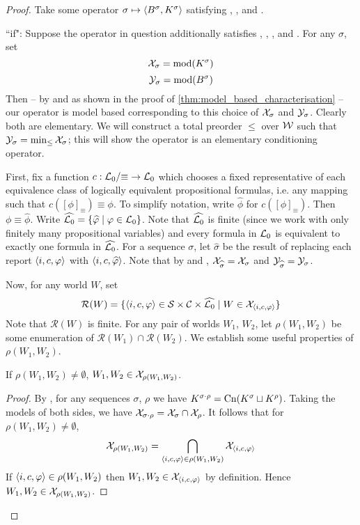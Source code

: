 \begin{proof}

Take some operator $\sigma \mapsto \langle {B^\sigma, K^\sigma} \rangle$ satisfying
\closure{}, \containment{}, \kconj{} and
\equivpost{}.

``if": Suppose the operator in question additionally satisfies
\rearr{}, \duprem{}, \condcons{},
\incvac{} and \acyc{}. For any $\sigma$, set
%
\[ \mathcal{X}_\sigma = \operatorname{mod}(K^\sigma) \] \[ \mathcal{Y}_\sigma = \operatorname{mod}(B^\sigma) \]
%
Then -- by \closure{} and \containment{} as shown in the proof of
\cref{thm:model_based_characterisation} -- our operator is model based
corresponding to this choice of $\mathcal{X}_\sigma$ and $\mathcal{Y}_\sigma$. Clearly both are
elementary. We will construct a total preorder $\le$ over $\mathcal{W}$ such that
$\mathcal{Y}_\sigma = \min_{\le}{\mathcal{X}_\sigma}$; this will show the operator is an
elementary conditioning operator.

First, fix a function $c: \mathcal{L}{}_0 / {\equiv} \to \mathcal{L}{}_0$ which chooses a fixed
representative of each equivalence class of logically equivalent propositional
formulas, i.e. any mapping such that $c([\phi]_{\equiv}) \equiv \phi$. To
simplify notation, write $\widehat{\phi}$ for $c([\phi]_{\equiv})$. Then $\phi
\equiv \widehat{\phi}$. Write $\widehat{\mathcal{L}{}_0} = \{\widehat{\varphi} \mid \varphi
\in \mathcal{L}{}_0\}$.  Note that $\widehat{\mathcal{L}{}_0}$ is finite (since we work with only
finitely many propositional variables) and every formula in $\mathcal{L}{}_0$ is
equivalent to exactly one formula in $\widehat{\mathcal{L}{}_0}$. For a sequence
$\sigma$, let $\widehat{\sigma}$ be the result of replacing each report
$\langle {i, c, \varphi} \rangle$ with $\langle {i, c, \widehat{\varphi}} \rangle$. Note that by
\rearr{} and \equivpost{}, $\mathcal{X}_{\widehat{\sigma}} =
\mathcal{X}_\sigma$ and $\mathcal{Y}_{\widehat{\sigma}} = \mathcal{Y}_\sigma$.

Now, for any world $W$, set
\newcommand{\reports}{\mathcal{R}}
\[
    \reports(W)
    = \{
        \tuple{i, c, \phi}
        \in \S \times \C \times \widehat{\lprop}
        \mid
        W \in \X_{\tuple{i, c, \phi}}
    \}
\]
Note that $\reports(W)$ is finite. For any pair of worlds $W_1$, $W_2$, let
$\rho(W_1, W_2)$ be some enumeration of $\reports(W_1) \cap \reports(W_2)$. We
establish some useful properties of $\rho(W_1, W_2)$.

    \begin{claim}
        \label{claim:w_j_in_rho}
        If $\rho(W_1, W_2) \ne \emptyset$, $W_1, W_2 \in \mathcal{X}_{\rho(W_1, W_2)}$.
    \end{claim}
    \begin{proof}
        By \kconj{}, for any sequences $\sigma$, $\rho$ we have
        $K^{\sigma \cdot \rho} = \operatorname{Cn}(K^\sigma \sqcup K^\rho)$.  Taking the
        models of both sides, we have $\mathcal{X}_{\sigma \cdot \rho} = \mathcal{X}_\sigma
        \cap \mathcal{X}_\rho$. It follows that for $\rho(W_1, W_2) \ne \emptyset$,
        \[
            \mathcal{X}_{\rho(W_1, W_2)}
            = \bigcap_{\langle {i, c, \varphi} \rangle \in \rho(W_1, W_2)}{\mathcal{X}_{\langle {i, c,
            \varphi} \rangle}}
        \]
        If $\langle {i, c, \varphi} \rangle \in \rho(W_1, W_2)$ then $W_1, W_2 \in
        \mathcal{X}_{\langle {i, c, \varphi} \rangle}$ by definition. Hence $W_1, W_2 \in
        \mathcal{X}_{\rho(W_1, W_2)}$.
    \end{proof}


\end{proof}
